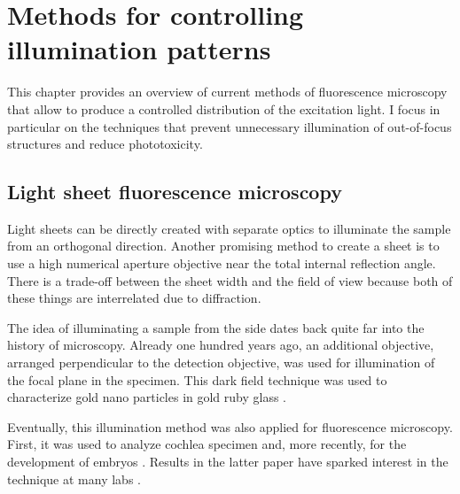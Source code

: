 
\chapter{Methods for controlling illumination patterns}
\label{sec:approaches}
%
\begin{summary}
  This chapter provides an overview of current methods of fluorescence
  microscopy that allow to produce a controlled distribution of the
  excitation light. I focus in particular on the techniques that prevent
  unnecessary illumination of out-of-focus structures and reduce
  phototoxicity.
\end{summary}
\section{Light sheet fluorescence microscopy}
\label{sec:light-sheet-microscopy}
\begin{summary}
  Light sheets can be directly created with separate optics to
  illuminate the sample from an orthogonal direction. Another
  promising method to create a sheet is to use a high numerical
  aperture objective near the total internal reflection angle. There
  is a trade-off between the sheet width and the field of view because
  both of these things are interrelated due to diffraction.
\end{summary}
The idea of illuminating a sample from the side dates back quite far
into the history of microscopy. Already one hundred years ago, an
additional objective, arranged perpendicular to the detection
objective, was used for illumination of the focal plane in the
specimen. This dark field technique was used to characterize gold nano
particles in gold ruby glass \citep{Siedentopf1903}.

Eventually, this illumination method was also applied for fluorescence
microscopy. First, it was used to analyze cochlea specimen
\citep{Voie1993} and, more recently, for the development of embryos
\citep{Huisken2004}. Results in the latter paper have sparked interest
in the technique at many labs \citep{Santi2011}.
